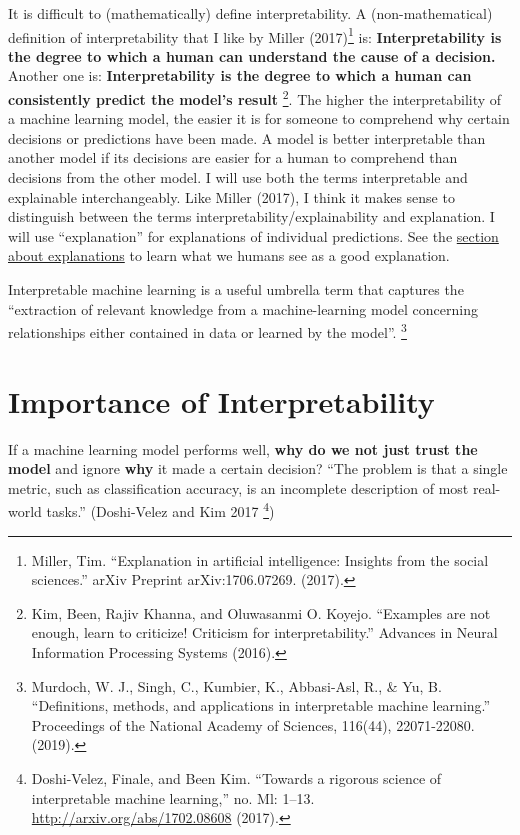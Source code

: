\documentclass[
  11pt,
]{scrbook}
\begin{document}
It is difficult to (mathematically) define interpretability.
A (non-mathematical) definition of interpretability that I like by Miller (2017)\footnote{Miller, Tim. ``Explanation in artificial intelligence: Insights from the social sciences.'' arXiv Preprint arXiv:1706.07269. (2017).} is:
\textbf{Interpretability is the degree to which a human can understand the cause of a decision.}
Another one is:
\textbf{Interpretability is the degree to which a human can consistently predict the model's result} \footnote{Kim, Been, Rajiv Khanna, and Oluwasanmi O. Koyejo. ``Examples are not enough, learn to criticize! Criticism for interpretability.'' Advances in Neural Information Processing Systems (2016).}.
The higher the interpretability of a machine learning model, the easier it is for someone to comprehend why certain decisions or predictions have been made.
A model is better interpretable than another model if its decisions are easier for a human to comprehend than decisions from the other model.
I will use both the terms interpretable and explainable interchangeably.
Like Miller (2017), I think it makes sense to distinguish between the terms interpretability/explainability and explanation.
I will use ``explanation'' for explanations of individual predictions.
See the \protect\hyperlink{explanation}{section about explanations} to learn what we humans see as a good explanation.

Interpretable machine learning is a useful umbrella term that captures the ``extraction of relevant knowledge from a machine-learning model concerning relationships either contained in data or learned by the model''. \footnote{Murdoch, W. J., Singh, C., Kumbier, K., Abbasi-Asl, R., \& Yu, B. ``Definitions, methods, and applications in interpretable machine learning.'' Proceedings of the National Academy of Sciences, 116(44), 22071-22080. (2019).}

\hypertarget{interpretability-importance}{%
\section{Importance of Interpretability}\label{interpretability-importance}}

If a machine learning model performs well, \textbf{why do we not just trust the model} and ignore \textbf{why} it made a certain decision?
``The problem is that a single metric, such as classification accuracy, is an incomplete description of most real-world tasks.'' (Doshi-Velez and Kim 2017 \footnote{Doshi-Velez, Finale, and Been Kim. ``Towards a rigorous science of interpretable machine learning,'' no. Ml: 1--13. \url{http://arxiv.org/abs/1702.08608} (2017).})
\end{document}
